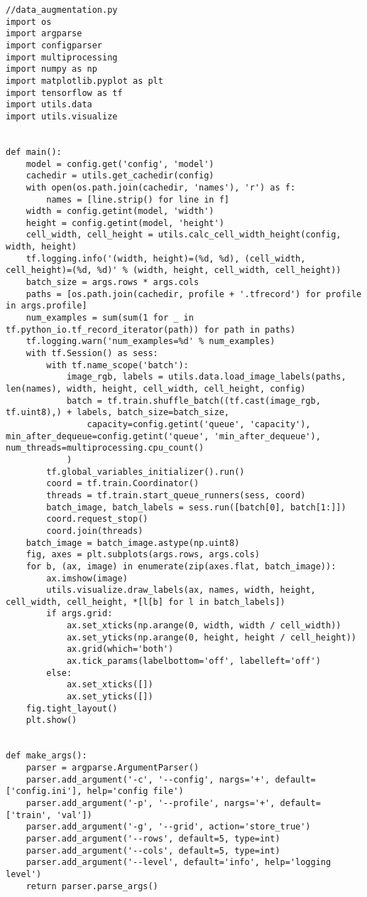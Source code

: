 \pagebreak
\begin{lstlisting}
//data_augmentation.py
import os
import argparse
import configparser
import multiprocessing
import numpy as np
import matplotlib.pyplot as plt
import tensorflow as tf
import utils.data
import utils.visualize


def main():
    model = config.get('config', 'model')
    cachedir = utils.get_cachedir(config)
    with open(os.path.join(cachedir, 'names'), 'r') as f:
        names = [line.strip() for line in f]
    width = config.getint(model, 'width')
    height = config.getint(model, 'height')
    cell_width, cell_height = utils.calc_cell_width_height(config, width, height)
    tf.logging.info('(width, height)=(%d, %d), (cell_width, cell_height)=(%d, %d)' % (width, height, cell_width, cell_height))
    batch_size = args.rows * args.cols
    paths = [os.path.join(cachedir, profile + '.tfrecord') for profile in args.profile]
    num_examples = sum(sum(1 for _ in tf.python_io.tf_record_iterator(path)) for path in paths)
    tf.logging.warn('num_examples=%d' % num_examples)
    with tf.Session() as sess:
        with tf.name_scope('batch'):
            image_rgb, labels = utils.data.load_image_labels(paths, len(names), width, height, cell_width, cell_height, config)
            batch = tf.train.shuffle_batch((tf.cast(image_rgb, tf.uint8),) + labels, batch_size=batch_size,
                capacity=config.getint('queue', 'capacity'), min_after_dequeue=config.getint('queue', 'min_after_dequeue'), num_threads=multiprocessing.cpu_count()
            )
        tf.global_variables_initializer().run()
        coord = tf.train.Coordinator()
        threads = tf.train.start_queue_runners(sess, coord)
        batch_image, batch_labels = sess.run([batch[0], batch[1:]])
        coord.request_stop()
        coord.join(threads)
    batch_image = batch_image.astype(np.uint8)
    fig, axes = plt.subplots(args.rows, args.cols)
    for b, (ax, image) in enumerate(zip(axes.flat, batch_image)):
        ax.imshow(image)
        utils.visualize.draw_labels(ax, names, width, height, cell_width, cell_height, *[l[b] for l in batch_labels])
        if args.grid:
            ax.set_xticks(np.arange(0, width, width / cell_width))
            ax.set_yticks(np.arange(0, height, height / cell_height))
            ax.grid(which='both')
            ax.tick_params(labelbottom='off', labelleft='off')
        else:
            ax.set_xticks([])
            ax.set_yticks([])
    fig.tight_layout()
    plt.show()


def make_args():
    parser = argparse.ArgumentParser()
    parser.add_argument('-c', '--config', nargs='+', default=['config.ini'], help='config file')
    parser.add_argument('-p', '--profile', nargs='+', default=['train', 'val'])
    parser.add_argument('-g', '--grid', action='store_true')
    parser.add_argument('--rows', default=5, type=int)
    parser.add_argument('--cols', default=5, type=int)
    parser.add_argument('--level', default='info', help='logging level')
    return parser.parse_args()


\end{lstlisting}

